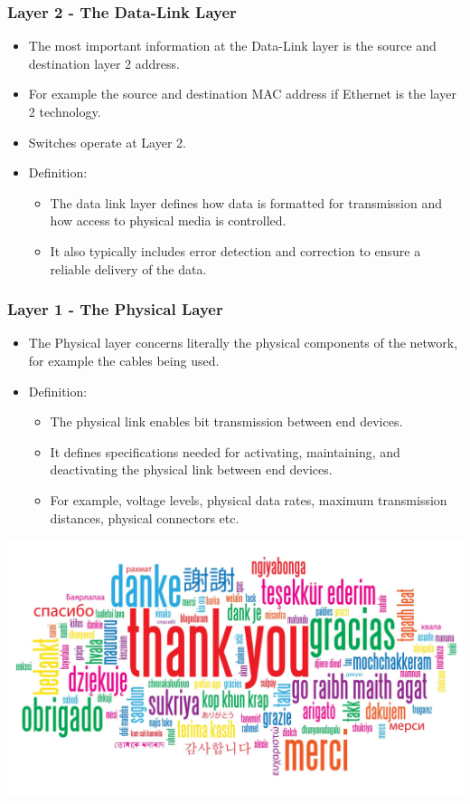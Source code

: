 \documentclass[pdflatex,compress]{beamer}
\begin{document}
\begin{frame}
	\frametitle{Layer 2 - The Data-Link Layer}
	\begin{itemize}
		\item The most important information at the Data-Link layer is the source and destination layer 2 address.
		\item For example the source and destination MAC address if Ethernet is the layer 2 technology.
		\item Switches operate at Layer 2.
		\item Definition:
		\begin{itemize}
			\item The data link layer defines how data is formatted for transmission and how access to physical media is controlled.
			\item It also typically includes error detection and correction to ensure a reliable delivery of the data.
		\end{itemize}
	\end{itemize}
\end{frame}

\begin{frame}
	\frametitle{Layer 1 - The Physical Layer}
	\begin{itemize}
		\item The Physical layer concerns literally the physical components of the network, for example the cables being used.
		\item Definition:
		\begin{itemize}
			\item The physical link enables bit transmission between end devices.
			\item It defines specifications needed for activating, maintaining, and deactivating the physical link between end devices.
			\item For example, voltage levels, physical data rates, maximum transmission distances, physical connectors etc.
		\end{itemize}
	\end{itemize}
\end{frame}

\begin{frame}
	\begin{center}
		\includegraphics[width=1\linewidth]{../../img/thank_you}
	\end{center}
\end{frame}
\end{document}
